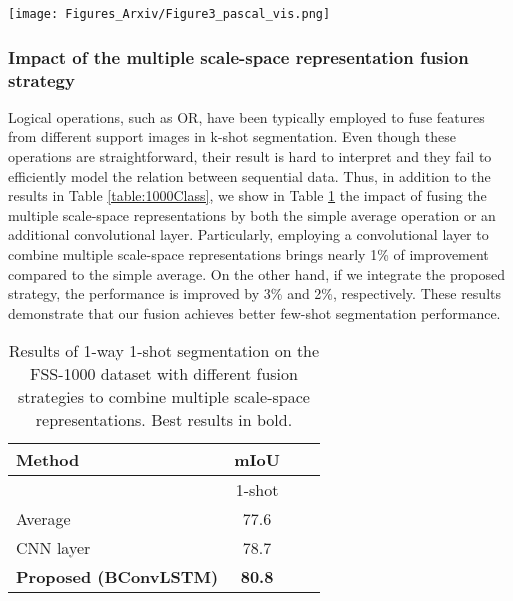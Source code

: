 \documentclass[runningheads]{llncs}
\begin{document}
\begin{figure*}[h!]
\centering
\texttt{[image: Figures\_Arxiv/Figure3\_pascal\_vis.png]}
\caption{Visual results on Pascal- in 1-way 1-shot setting using the proposed method. The support set, as well as predictions on several query images with corresponding ground truths are shown.}
\label{fig:pascal_vis}
\vspace{-3mm}
\end{figure*}



\vspace{-1mm}

\subsubsection{Impact of the multiple scale-space representation fusion strategy}
Logical operations, such as OR, have been typically employed to fuse features from different support images in k-shot segmentation. Even though these operations are straightforward, their result is hard to interpret and they fail to efficiently model the relation between sequential data. Thus, in addition to the results in Table \ref{table:1000Class}, we show in Table \ref{table:1000Class_Sup} the impact of fusing the multiple scale-space representations by both the simple average operation or an additional convolutional layer. Particularly, employing a convolutional layer to combine multiple scale-space representations brings nearly 1\% of improvement compared to the simple average. On the other hand, if we integrate the proposed strategy, the performance is improved by 3\% and 2\%, respectively.  These results demonstrate that our fusion achieves better few-shot segmentation performance.




\begin{table}[h!]
\footnotesize
\begin{center}
\caption{Results of 1-way 1-shot segmentation on the FSS-1000 dataset with different fusion strategies to combine multiple scale-space representations. Best results in bold.}

\label{table:headings}
\begin{tabular}{lccc}
\hline\noalign{\smallskip}
 Method & mIoU\\
\hline
& \multicolumn{1}{c}{1-shot}  \\
\hline
\noalign{\smallskip}
Average  & 77.6 \\
CNN layer & 78.7 \\
\bf Proposed (BConvLSTM)  & \bf 80.8 \\
\hline

\end{tabular}
\label{table:1000Class_Sup}
\end{center}
\vspace{-4.75mm}
\end{table}
\end{document}
